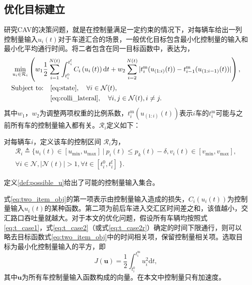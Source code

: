 \subsection{优化目标建立}
研究CAV的决策问题，就是在控制量满足一定约束的情况下，对每辆车给出一列控制量输入$u_i(t)$对于车道汇合的场景，一般优化目标包含最小化控制量的输入和最小化平均通行时间。\cite{Rios2016Automated}将二者包含在同一目标函数中，表达为，
\begin{equation}
\begin{aligned}
&\min_{u_i\in \mathcal{R}_i}\left(w_1\frac12\sum^{N(t)}_{i=1}\int_{t_i^0}^{t_i^\mathrm{f}}C_i\left(u_i\left(t\right)\right)\mathrm{d}t + w_2\sum_{i=2}^{N(t)}|t_i^\mathrm{m}(u_{(1:i)}(t))-t_{i-1}^\mathrm{m}(u_{(1:i-1)}(t))|\right),\\
&
\begin{aligned}
\text{Subject to:} & \quad \mbox{\eqref{eq:state}}, \quad \forall i\in \mathcal{N}(t),\\
& \quad \mbox{\eqref{eq:colli_lateral}}, \quad \forall i,j \in \mathcal{N}(t), i\neq j.
\end{aligned}
\end{aligned}
\label{eq:two_item_obj}
\end{equation}
其中$w_1$，$w_2$为调整两项权重的比例系数，$t_i^\mathrm{m}(u_{(1:i)}(t))$表示$i$车的$t_i^\mathrm{m}$可能与之前所有车的控制量输入都有关。$\mathcal{R}_i$定义如下：
\begin{definition}[控制区间]
对每辆车$i$，定义该车的{\heiti 控制区间} $\mathcal{R}_i$为，
\begin{equation}
\begin{gathered}
\mathcal{R}_i\triangleq\{u_i(t)\in[u_{\min}, u_{\max}]\ |\ p_i(t)\leq p_k(t)-\delta, v_i(t)\in[v_{\min}, v_{\max}],\\
\forall i \in \mathcal{N}, |\mathcal{N}(t)|>1, \forall t \in [t_i^0, t_i^\mathrm{f}]\ \}.
\end{gathered}
\end{equation}
\label{def:possible_u}
\end{definition}
定义\ref{def:possible_u}给出了可能的控制量输入集合。

式\eqref{eq:two_item_obj}的第一项表示由控制量输入造成的损失，$C_i(u_i(t))$为控制量输入$u_i(t)$的某种函数。第二项为前后车进入交汇区时间差之和，该值越小，交汇路口吞吐量就越大。对于本文的优化问题，假设所有车辆均按照式\eqref{eq:t_case1}，式\eqref{eq:t_case2}（或式\eqref{eq:t_case2r}）确定的时间下限通行，则可以略去目标函数式\eqref{eq:two_item_obj}中的时间相关项，保留控制量相关项。选取目标为最小化控制量输入的平方\cite{Malikopoulos2016A,Rios2016Automated}，即
\begin{equation}
J(\bm{u})=\frac12\int_{t_i^0}^{t_i^\mathrm{m}}u_i^2\mathrm{d}t,
\label{eq:one_item_obj}
\end{equation}
其中$\bm{u}$为所有车控制量输入函数构成的向量。在本文中控制量只有加速度。